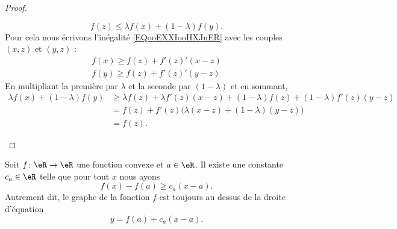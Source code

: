 \begin{proof}
\begin{subproof}
\begin{equation}
                f(z)\leq \lambda f(x)+(1-\lambda)f(y).
            \end{equation}
            Pour cela nous écrivons l'inégalité \eqref{EQooEXXIooHXJnER} avec les couples \( (x,z)\) et \( (y,z)\) :
            \begin{subequations}
                \begin{align}
                    f(x)\geq f(z)+f'(z)'(x-z)\\
                    f(y)\geq f(z)+f'(z)'(y-z)
                \end{align}
            \end{subequations}
            En multipliant la première par \( \lambda\) et la seconde par \( (1-\lambda)\) et en sommant,
            \begin{subequations}
                \begin{align}
                    \lambda f(x)+(1-\lambda)f(y)  & \geq  \lambda f(z)+\lambda f'(z)(x-z)+(1-\lambda)f(z)+(1-\lambda)f'(z)(y-z)   \\
                                                  &   =   f(z)+f'(z)\big( \lambda(x-z)+(1-\lambda)(y-z) \big)                     \\
                                                  &   =   f(z).
                \end{align}
            \end{subequations}
    \end{subproof}
\end{proof}

\begin{proposition} \label{PropNIBooSbXIKO}
    Soit \( f\colon \eR\to \eR \) une fonction convexe et \( a\in \eR\). Il existe une constante \( c_a\in \eR\) telle que pour tout \( x\) nous ayons
    \begin{equation}    \label{EqSKIooSeAekM}
        f(x)-f(a)\geq c_a(x-a).
    \end{equation}
    Autrement dit, le graphe de la fonction \( f\) est toujours au dessus de la droite d'équation
    \begin{equation}
        y=f(a)+c_a(x-a).
    \end{equation}
\end{proposition}

